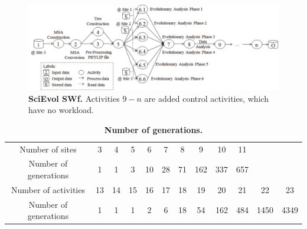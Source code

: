 \begin{figure}
\begin{centering}
\captionsetup{justification=centering}
\includegraphics[width=140mm]{figures/FIG16}
\par\end{centering}
\caption{\textbf{SciEvol SWf. } Activities $9 - n$  are added control activities, which have no workload.}
\label{fig:nscievol}
\end{figure}


\begin{table}[htbp]
\caption{\textbf{Number of generations. }}
\label{tab:generations}
\begin{centering}
\captionsetup{justification=centering}
\begin{tabular}{|c|c|c|c|c|c|c|c|c|c|c|c|}
\cline{1-10}
Number of sites & 3 & 4 & 5 & 6 & 7 & 8 & 9 & 10 & 11 \\
\cline{1-10}  
Number of generations & 1 & 1 & 3 & 10 & 28 & 71 & 162 & 337 & 657 \tabularnewline
\cline{1-10}
\hline
Number of activities & 13 & 14 & 15 & 16 & 17 & 18 & 19 & 20 & 21 & 22 & 23 \\
\hline  
Number of generations & 1 & 1 & 1 & 2 & 6 & 18 & 54 & 162 & 484 & 1450 & 4349 \tabularnewline
\hline
\end{tabular}
\par\end{centering} 
\end{table}

